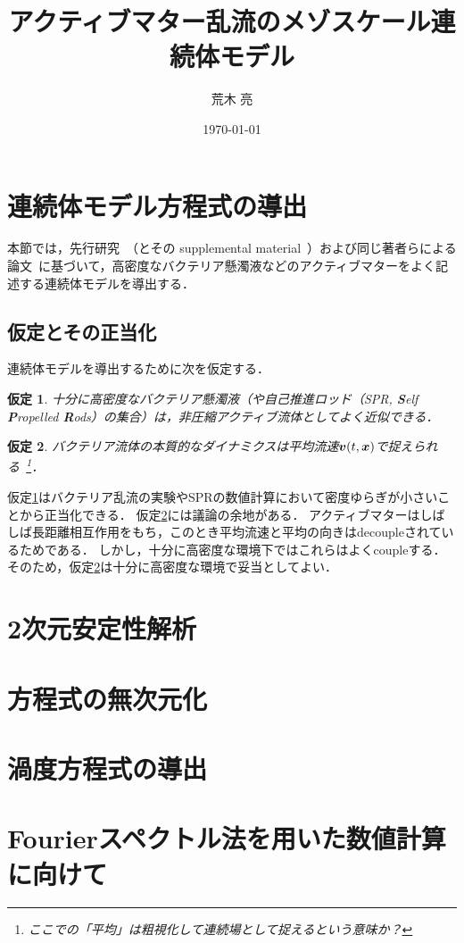 \documentclass[12pt,dvipdfmx,svgnames,a4paper,uplatex]{ujarticle}
\title{アクティブマター乱流のメゾスケール連続体モデル}
\author{荒木 亮}
\date{\today}
\theoremstyle{plain}
\newtheorem{assumption}{仮定}
\begin{document}
\maketitle
\tableofcontents

\section{連続体モデル方程式の導出}
\label{sec:derive_continuous_model}

本節では，先行研究~\cite{Wensink2012b}（とその supplemental material~\cite{Wensink2012a}）および同じ著者らによる論文~\cite{Dunkel2013a}に基づいて，高密度なバクテリア懸濁液などのアクティブマターをよく記述する連続体モデルを導出する．


\subsection{仮定とその正当化}
\label{subsec:assumptions_justification}

連続体モデルを導出するために次を仮定する．

\begin{assumption}
  \label{as:incompressibility}
  十分に高密度なバクテリア懸濁液（や自己推進ロッド（SPR, \textbf{S}elf \textbf{P}ropelled \textbf{R}ods）の集合）は，非圧縮アクティブ流体としてよく近似できる．
\end{assumption}

\begin{assumption}
  \label{as:mean_velocity_field}
  バクテリア流体の本質的なダイナミクスは平均流速\(\vb*{v}(t,\vb*{x})\)で捉えられる~\footnote{ここでの「平均」は粗視化して連続場として捉えるという意味か？}．
\end{assumption}

仮定\ref{as:incompressibility}はバクテリア乱流の実験やSPRの数値計算において密度ゆらぎが小さいことから正当化できる．
仮定\ref{as:mean_velocity_field}には議論の余地がある．
アクティブマターはしばしば長距離相互作用をもち，このとき平均流速と平均の向きはdecoupleされているためである．
しかし，十分に高密度な環境下ではこれらはよくcoupleする．
そのため，仮定\ref{as:mean_velocity_field}は十分に高密度な環境で妥当としてよい．




\section{2次元安定性解析}


\section{方程式の無次元化}


\section{渦度方程式の導出}


\section{Fourierスペクトル法を用いた数値計算に向けて}


\printbibliography[title=参考文献]
\end{document}

